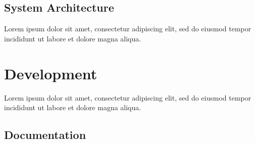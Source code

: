 \documentclass[12pt, a4paper]{article}
\begin{document}

\subsection{System Architecture}



Lorem ipsum dolor sit amet, consectetur adipiscing elit, sed do eiusmod tempor incididunt ut labore et dolore magna aliqua.


\pagebreak


\section{Development}





Lorem ipsum dolor sit amet, consectetur adipiscing elit, sed do eiusmod tempor incididunt ut labore et dolore magna aliqua.


\subsection{Documentation}
\end{document}
